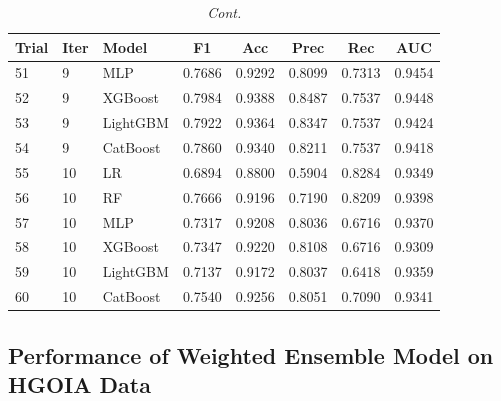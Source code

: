 \documentclass[diagnostics,article,accept,pdftex,moreauthors]{Definitions/mdpi}
\begin{document}
\begin{table}[H]\ContinuedFloat   
\caption{\emph{Cont.}\label{tab:cautoml-performance}}
\begin{tabularx}{\linewidth}{LlLCCCCC}
\toprule





\textbf{Trial} & \textbf{Iter} & \textbf{Model} &
\textbf{F1} & \textbf{Acc} & \textbf{Prec} & \textbf{Rec} & \textbf{AUC} \\
\midrule




51 & 9  & MLP      & 0.7686 & 0.9292 & 0.8099 & 0.7313 & 0.9454 \\
52 & 9  & XGBoost  & 0.7984 & 0.9388 & 0.8487 & 0.7537 & 0.9448 \\
53 & 9  & LightGBM & 0.7922 & 0.9364 & 0.8347 & 0.7537 & 0.9424 \\
54 & 9  & CatBoost & 0.7860 & 0.9340 & 0.8211 & 0.7537 & 0.9418 \\
55 & 10 & LR       & 0.6894 & 0.8800 & 0.5904 & 0.8284 & 0.9349 \\
56 & 10 & RF       & 0.7666 & 0.9196 & 0.7190 & 0.8209 & 0.9398 \\
57 & 10 & MLP      & 0.7317 & 0.9208 & 0.8036 & 0.6716 & 0.9370 \\
58 & 10 & XGBoost  & 0.7347 & 0.9220 & 0.8108 & 0.6716 & 0.9309 \\
59 & 10 & LightGBM & 0.7137 & 0.9172 & 0.8037 & 0.6418 & 0.9359 \\
60 & 10 & CatBoost & 0.7540 & 0.9256 & 0.8051 & 0.7090 & 0.9341 \\
\bottomrule
\end{tabularx}

\end{table}
 
 

\subsection{Performance of Weighted Ensemble Model on \ac{HGOIA} Data}
\label{sec:performance-aws-sage-maker-canvas}
\end{document}
